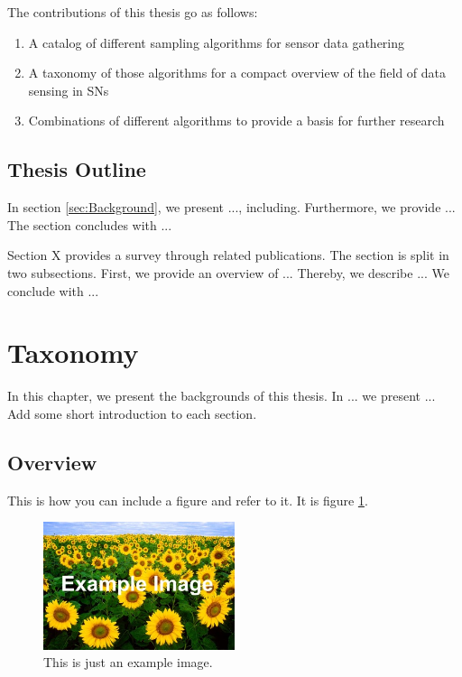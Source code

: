 The contributions of this thesis go as follows: 
\begin{enumerate}
	\item A catalog of different sampling algorithms for sensor data gathering
	\item A taxonomy of those algorithms for a compact overview of the field of data sensing in \acp{SN}
	\item Combinations of different algorithms to provide a basis for further research
\end{enumerate}
\clearpage

\subsection{Thesis Outline}

  In section  \ref{sec:Background}, we present ..., including. Furthermore, we provide ... The section concludes with ...

 Section X provides a survey through related publications. The section is split in two subsections. First, we provide an overview of ... Thereby, we describe ... We conclude with ...

\section{Taxonomy}
\label{sec:Taxonomy}

In this chapter, we present the backgrounds of this thesis. In ... we present ... Add some short introduction to each section.

\subsection{Overview}
\label{sec:Overview}

This is how you can include a figure and refer to it. It is figure \ref{fig:Example}.

\begin{figure}[h!]
	\begin{center}
		\includegraphics[width=0.5\textwidth]{images/Example.jpg}
		\caption{This is just an example image.}
		\label{fig:Example}
	\end{center}
\end{figure}

